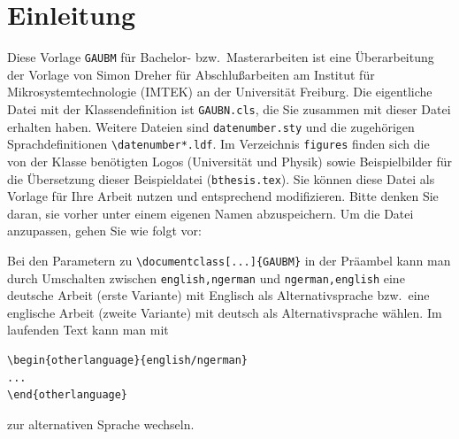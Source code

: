\documentclass[bachelor,       %
               twoside,        %
               BCOR10mm,       %
               ngerman,english  %
               ]{GAUBM}
\begin{document}
\mainmatter   %

\chapter{Einleitung}
Diese Vorlage \verb!GAUBM!
f{\"u}r Bachelor- bzw.\ Masterarbeiten ist eine {\"U}berarbeitung der
Vorlage von Simon Dreher f{\"u}r Abschlu{\ss}arbeiten am
Institut f{\"u}r Mikrosystemtechnologie (IMTEK)
an der Universit{\"a}t Freiburg. Die eigentliche Datei mit der Klassendefinition
ist \verb!GAUBN.cls!, die Sie zusammen mit dieser Datei erhalten haben. Weitere
Dateien sind \verb!datenumber.sty! und die zugeh{\"o}rigen Sprachdefinitionen
\verb!\datenumber*.ldf!. Im Verzeichnis \verb!figures! finden sich die
von der Klasse ben{\"o}tigten Logos (Universit{\"a}t und Physik) sowie Beispielbilder
f{\"u}r die {\"U}bersetzung dieser Beispieldatei (\verb!bthesis.tex!).
Sie k{\"o}nnen diese Datei als Vorlage f{\"u}r Ihre Arbeit nutzen und entsprechend
modifizieren. Bitte denken Sie daran, sie vorher unter einem eigenen Namen
abzuspeichern.
Um die Datei anzupassen, gehen Sie wie folgt vor:

Bei den Parametern zu \verb!\documentclass[...]{GAUBM}! in der Pr{\"a}ambel
kann man durch Umschalten
zwischen \verb!english,ngerman! und \verb!ngerman,english! eine
deutsche Arbeit (erste Variante) mit Englisch als Alternativsprache bzw.\ eine
englische Arbeit (zweite Variante) mit deutsch als Alternativsprache
wählen. Im laufenden Text kann man mit 
\begin{verbatim}
\begin{otherlanguage}{english/ngerman}
...
\end{otherlanguage}
\end{verbatim}
zur alternativen Sprache wechseln.
\end{document}
